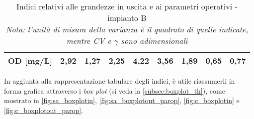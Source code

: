 \begin{sidewaystable}[h]
\begin{center}
\begin{tabular}{lcccccccc}
		\multicolumn{1}{|l|}{\textbf{OD {[}mg/L{]}}}              & \multicolumn{1}{c|}{2,92}           & \multicolumn{1}{c|}{1,27}                    & \multicolumn{1}{c|}{2,25}             & \multicolumn{1}{c|}{4,22}                    & \multicolumn{1}{c|}{3,56}            & \multicolumn{1}{c|}{1,89}             & \multicolumn{1}{c|}{0,65}        & \multicolumn{1}{c|}{0,77}           \\ \hline
	\end{tabular}
\end{center}
	\caption{Indici relativi alle grandezze in uscita e ai parametri operativi - impianto B \\ \textit{Nota: l'unità di misura della varianza è il quadrato di quelle indicate, mentre CV e $\gamma$ sono adimensionali}}
\label{tab:c_indici_out_parop}
\end{sidewaystable}

In aggiunta alla rappresentazione tabulare degli indici, è utile riassumerli in forma grafica attraverso i \textit{box plot} (si veda la \autoref{subsec:boxplot_th}), come mostrato in \autoref{fig:sa_boxplotin}, \autoref{fig:sa_boxplotout_parop}, \autoref{fig:c_boxplotin} e \autoref{fig:c_boxplotout_parop}.

